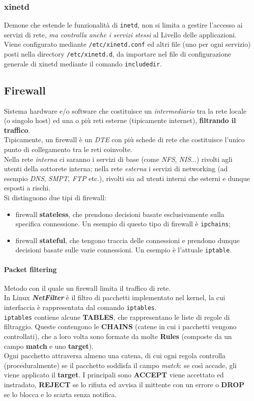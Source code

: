 \documentclass[a4paper,11pt]{article}
\def\code#1{\texttt{#1}}
\def\para#1{\paragraph{#1}\label{#1}}
\begin{document}
\subsubsection{xinetd} 
Demone che estende le funzionalità di \code{inetd}, non si limita a gestire l'accesso ai servizi di rete, \textit{ma controlla anche i servizi stessi} al Livello delle applicazioni.\\
Viene configurato mediante \code{/etc/xinetd.conf} ed altri file (uno per ogni servizio) posti nella directory \code{/etc/xinetd.d}, da importare nel file di configurazione generale di xinetd mediante il comando \code{includedir}. 

\subsection{Firewall} Sistema hardware e/o software che costituisce un\textit{ intermediario} tra la rete locale (o singolo host) ed una o più reti esterne (tipicamente internet), \textbf{filtrando il traffico}. \\Tipicamente, un firewall è un \textit{DTE} con più schede di rete che costituisce l'unico punto di collegamento tra le reti coinvolte.\\
Nella rete \textit{interna} ci saranno i servizi di base (come \textit{NFS}, \textit{NIS}...) rivolti agli utenti della sottorete interna; nella rete \textit{esterna} i servizi di networking (ad esempio \textit{DNS}, \textit{SMPT}, \textit{FTP} etc.), rivolti sia ad utenti interni che esterni e dunque esposti a rischi.\\
Si distinguono due tipi di firewall:
\begin{itemize}
\item firewall \textbf{stateless}, che prendono decisioni basate esclusivamente sulla specifica connessione. Un esempio di questo tipo di firewall è \code{ipchains};
\item firewall \textbf{stateful}, che tengono traccia delle connessioni e prendono dunque decisioni basate sulle varie connessioni. Un esempio è l'attuale \code{iptable}.
\end{itemize}
\para{Packet filtering} Metodo con il quale un firewall limita il traffico di rete.\\
In Linux \textit{\textbf{NetFilter}} è il filtro di pacchetti  implementato nel kernel, la cui interfaccia è rappresentata dal comando \code{iptables}.\\
\code{iptables} contiene alcune \textbf{TABLES}, che rappresentano le liste di regole di filtraggio. Queste contengono le \textbf{CHAINS} (catene in cui i pacchetti vengono controllati), che a loro volta sono formate da molte \textbf{Rules} (composte da un campo \textbf{match} e uno \textbf{target}).\\ Ogni pacchetto attraversa almeno una catena, di cui ogni regola controlla (proceduralmente) se il pacchetto soddisfa il campo \textit{match}: se così accade, gli viene applicato il \textbf{target}. I principali sono \textbf{ACCEPT} viene accettato ed instradato, \textbf{REJECT} se lo rifiuta ed avvisa il mittente con un errore o \textbf{DROP} se lo blocca e lo scarta senza notifica.\\
\end{document}
